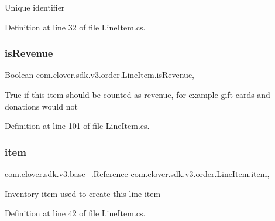 Unique identifier 



Definition at line 32 of file Line\+Item.\+cs.

\mbox{\label{classcom_1_1clover_1_1sdk_1_1v3_1_1order_1_1_line_item_a287202191b4ff40b5234589dd8071431}} 
\subsubsection{\texorpdfstring{is\+Revenue}{isRevenue}}
{\footnotesize\ttfamily Boolean com.\+clover.\+sdk.\+v3.\+order.\+Line\+Item.\+is\+Revenue\hspace{0.3cm}{\ttfamily [get]}, {\ttfamily [set]}}



True if this item should be counted as revenue, for example gift cards and donations would not 



Definition at line 101 of file Line\+Item.\+cs.

\mbox{\label{classcom_1_1clover_1_1sdk_1_1v3_1_1order_1_1_line_item_aa64477b9aa862583358c5a9c93e74900}} 
\subsubsection{\texorpdfstring{item}{item}}
{\footnotesize\ttfamily \hyperlink{classcom_1_1clover_1_1sdk_1_1v3_1_1base___1_1_reference}{com.\+clover.\+sdk.\+v3.\+base\+\_\+.\+Reference} com.\+clover.\+sdk.\+v3.\+order.\+Line\+Item.\+item\hspace{0.3cm}{\ttfamily [get]}, {\ttfamily [set]}}



Inventory item used to create this line item 



Definition at line 42 of file Line\+Item.\+cs.

